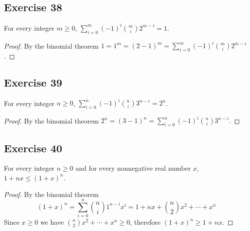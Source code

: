 \documentclass[14pt]{extarticle}
\newcommand{\dps}{\displaystyle}
\begin{document}
\subsection{Exercise 38}
For every integer \(m \geq 0\), \(\dps \sum_{i=0}^{m} (-1)^i \binom{m}{i}2^{m-i} = 1\).

\begin{proof}
     By the binomial theorem \(1 = 1^m = (2-1)^m = \sum_{i=0}^{m} (-1)^i \binom{m}{i}2^{m-i}\).
\end{proof}

\subsection{Exercise 39}
For every integer \(n \geq 0\), \(\dps \sum_{i=0}^{n} (-1)^i \binom{n}{i}3^{n-i} = 2^n\).

\begin{proof}
     By the binomial theorem \(2^n = (3-1)^n = \sum_{i=0}^{n} (-1)^i \binom{n}{i}3^{n-i}.\)
\end{proof}

\subsection{Exercise 40}
For every integer \(n \geq 0\) and for every nonnegative real number \(x\), \(1 + nx \leq (1 + x)^n\).

\begin{proof}
     By the binomial theorem
     \[
          (1+x)^n = \sum_{i=0}^{n} \binom{n}{i}1^{n-i}x^i = 1 + nx + \binom{n}{2}x^2 + \cdots + x^n
     \]
     Since \(x \geq 0\) we have \(\binom{n}{2}x^2 + \cdots + x^n \geq 0\), therefore \((1+x)^n \geq 1 + nx\).
\end{proof}
\end{document}
